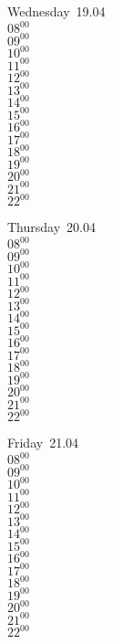 \documentclass[11pt,a4paper]{book}\usepackage[]{graphicx}\usepackage[]{color}
\begin{document}
\begin{weekdaybox}
  Wednesday~19.04\\
  { 
  \vfill
  $08^{00}$\\
$09^{00}$\\
$10^{00}$\\
$11^{00}$\\
$12^{00}$\\
$13^{00}$\\
$14^{00}$\\
$15^{00}$\\
$16^{00}$\\
$17^{00}$\\
$18^{00}$\\
$19^{00}$\\
$20^{00}$\\
$21^{00}$\\
$22^{00}$\\
  }
\end{weekdaybox}
\clearpage
\begin{headerbox}
\end{headerbox}
\begin{weekdaybox}
  Thursday~20.04\\
  { 
  \vfill
  $08^{00}$\\
$09^{00}$\\
$10^{00}$\\
$11^{00}$\\
$12^{00}$\\
$13^{00}$\\
$14^{00}$\\
$15^{00}$\\
$16^{00}$\\
$17^{00}$\\
$18^{00}$\\
$19^{00}$\\
$20^{00}$\\
$21^{00}$\\
$22^{00}$\\
  }
\end{weekdaybox} 
\begin{weekdaybox}
  Friday~21.04\\
  { 
  \vfill
  $08^{00}$\\
$09^{00}$\\
$10^{00}$\\
$11^{00}$\\
$12^{00}$\\
$13^{00}$\\
$14^{00}$\\
$15^{00}$\\
$16^{00}$\\
$17^{00}$\\
$18^{00}$\\
$19^{00}$\\
$20^{00}$\\
$21^{00}$\\
$22^{00}$\\
  }
\end{weekdaybox}
\end{document}

